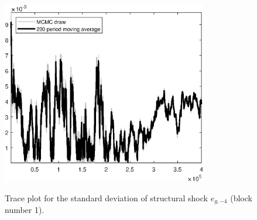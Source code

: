 \begin{figure}[H]
\centering
  \includegraphics[width=0.8\textwidth]{BRS_sectoral/graphs/TracePlot_SE_e_g_news_4_blck_1}\\
    \caption{Trace plot for the standard deviation of structural shock ${e_{g,-4}}$ (block number 1).}
\end{figure}
